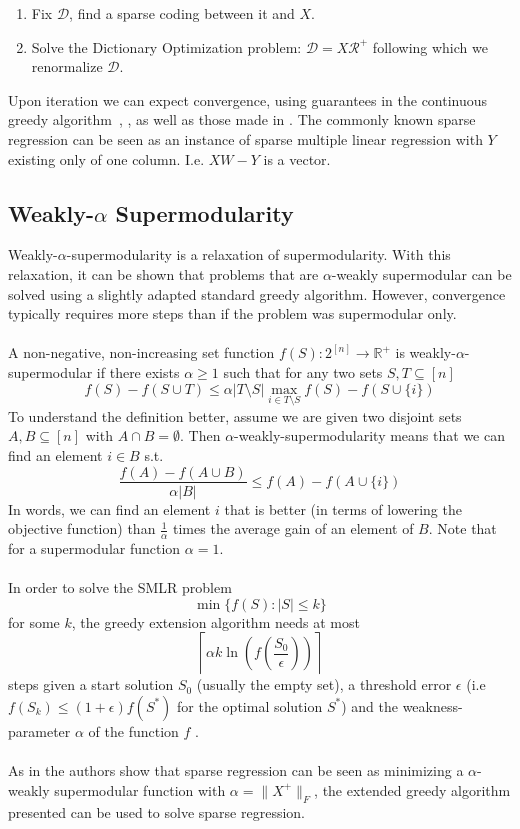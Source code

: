 \documentclass{article}
\begin{document}
\begin{enumerate}
\item Fix $\mathcal{D}$, find a sparse coding between it and $X$.
\item Solve the Dictionary Optimization problem: $\mathcal{D} = X\mathcal{R}^{+}$ following which we renormalize $\mathcal{D}$.
\end{enumerate}
Upon iteration we can expect convergence, using guarantees in the continuous greedy algorithm~\cite{greedy_selection}, \cite{submod_spectral}, \cite{submod_sparsecoding} as well as those made in \cite{BoutsidisLS15}. The commonly known sparse regression can be seen as an instance of sparse multiple linear regression with $Y$ existing only of one column. I.e. $XW-Y$ is a vector. 

\subsection{Weakly-$\alpha$ Supermodularity} \label{weakalpha}

Weakly-$\alpha$-supermodularity is a relaxation of supermodularity. With this relaxation, it can be shown that problems that are $\alpha$-weakly supermodular can be solved using a slightly adapted standard greedy algorithm. However, convergence typically requires more steps than  if the problem was supermodular only.
\\
\\
A non-negative, non-increasing set function $f(S): 2^{[n]} \rightarrow \mathbb{R}^+$ is weakly-$\alpha$-supermodular if there exists $\alpha \geq 1$ such that for any two sets $S, T \subseteq [n]$
\[f(S) - f(S \cup T) \leq \alpha \vert T \setminus S\vert \max_{i \in T \setminus S} f(S) - f(S \cup \lbrace i \rbrace) \]
To understand the definition better, assume we are given two disjoint sets $A, B \subseteq [n]$ with $A \cap B = \emptyset$. Then $\alpha$-weakly-supermodularity means that we can find an element $i \in B$ s.t. 
\[
\frac{f(A) - f(A \cup B)}{\alpha \vert B\vert} \leq f(A) - f(A \cup \lbrace i \rbrace)
\]
In words, we can find an element $i$ that is better (in terms of lowering the objective function) than $\frac{1}{\alpha}$ times the average gain of an element of $B$. Note that for a supermodular function $\alpha = 1$.
\\
\\
In order to solve the SMLR problem 
\[\min \lbrace f(S) : \vert S \vert \leq k \rbrace \]
for some $k$, the greedy extension algorithm needs at most 
\[ \left\lceil \alpha k \ln \left(f\left(\frac{S_0}{\epsilon}\right)\right)\right\rceil \]
 steps given a start solution $S_0$ (usually the empty set), a threshold error $\epsilon$ (i.e $f(S_k) \leq (1+\epsilon)f(S^*)$ for the optimal solution $S^*$) and the weakness-parameter $\alpha$ of the function $f$ \cite{BoutsidisLS15}.
 \\
 \\
As in \cite{BoutsidisLS15} the authors show that sparse regression can be seen as minimizing a $\alpha$-weakly supermodular function with $\alpha = \| X^+ \|_F$, the extended greedy algorithm presented can be used to solve sparse regression.
\end{document}
